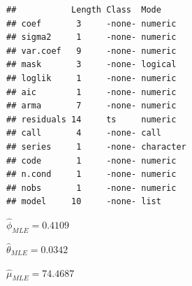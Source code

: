 \documentclass[
]{article}
\begin{document}
\begin{verbatim}
##           Length Class  Mode     
## coef       3     -none- numeric  
## sigma2     1     -none- numeric  
## var.coef   9     -none- numeric  
## mask       3     -none- logical  
## loglik     1     -none- numeric  
## aic        1     -none- numeric  
## arma       7     -none- numeric  
## residuals 14     ts     numeric  
## call       4     -none- call     
## series     1     -none- character
## code       1     -none- numeric  
## n.cond     1     -none- numeric  
## nobs       1     -none- numeric  
## model     10     -none- list
\end{verbatim}

\(\hat{\phi}_{MLE} = 0.4109\)

\(\hat{\theta}_{MLE} = 0.0342\)

\(\hat{\mu}_{MLE} = 74.4687\)
\end{document}
